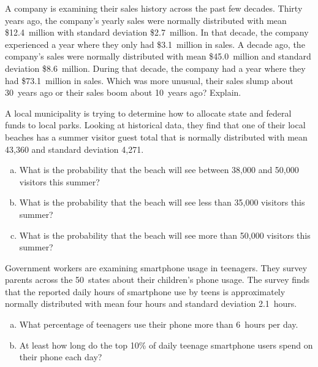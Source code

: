 \documentclass[11pt,letterpaper]{article}
\begin{document}

 A company is examining their sales history across the past few decades. Thirty years ago, the company's yearly sales were normally distributed with mean \$12.4~million with standard deviation \$2.7~million. In that decade, the company experienced a year where they only had \$3.1~million in sales. A decade ago, the company's sales were normally distributed with mean \$45.0~million and standard deviation \$8.6~million. During that decade, the company had a year where they had \$73.1~million in sales. Which was more unusual, their sales slump about 30~years ago or their sales boom about 10~years ago? Explain. 



\newpage



 A local municipality is trying to determine how to allocate state and federal funds to local parks. Looking at historical data, they find that one of their local beaches has a summer visitor guest total that is normally distributed with mean 43,360 and standard deviation 4,271. 
	\begin{enumerate}[(a)]
	\item What is the probability that the beach will see between 38,000 and 50,000 visitors this summer?
	\item What is the probability that the beach will see less than 35,000 visitors this summer?
	\item What is the probability that the beach will see more than 50,000 visitors this summer? 
	\end{enumerate}



\newpage



 Government workers are examining smartphone usage in teenagers. They survey parents across the 50~states about their children's phone usage. The survey finds that the reported daily hours of smartphone use by teens is approximately normally distributed with mean four hours and standard deviation 2.1~hours. 
	\begin{enumerate}[(a)]
	\item What percentage of teenagers use their phone more than 6~hours per day.
	\item At least how long do the top 10\% of daily teenage smartphone users spend on their phone each day?
	\end{enumerate}
\end{document}
